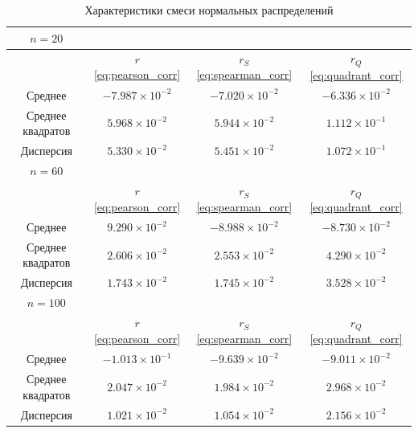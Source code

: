 \documentclass[12pt,a4paper]{article}
\begin{document}
	\begin{table}[htbp!]
		\centering
		\begin{tabular}{ |c|c|c|c| }
			\hline
			\( n = 20 \) & & & \\
			\hline
			& \( r \) \eqref{eq:pearson_corr} & \( r_S \) \eqref{eq:spearman_corr} &
			\( r_Q \) \eqref{eq:quadrant_corr} \\
			\hline
			Среднее & \( -7.987 \times 10^{-2} \) & \( -7.020 \times 10^{-2} \) &
			\( -6.336 \times 10^{-2} \) \\
			\hline
			Среднее квадратов & \(5.968 \times 10^{-2} \) &
			\( 5.944 \times 10^{-2} \) & \( 1.112 \times 10^{-1} \) \\
			\hline
			Дисперсия & \( 5.330 \times 10^{-2} \) &
			\( 5.451 \times 10^{-2} \) & \( 1.072 \times 10^{-1} \) \\
			\hline
			\hline
			\( n = 60 \) & & & \\
			\hline
			& \( r \) \eqref{eq:pearson_corr} & \( r_S \) \eqref{eq:spearman_corr} &
			\( r_Q \) \eqref{eq:quadrant_corr} \\
			\hline
			Среднее & \( 9.290 \times 10^{-2} \) & \( -8.988 \times 10^{-2} \) &
			\( -8.730 \times 10^{-2} \) \\
			\hline
			Среднее квадратов & \( 2.606 \times 10^{-2} \) &
			\( 2.553 \times 10^{-2} \) & \( 4.290 \times 10^{-2} \) \\
			\hline
			Дисперсия & \( 1.743 \times 10^{-2} \) &
			\( 1.745 \times 10^{-2} \) & \( 3.528 \times 10^{-2} \) \\
			\hline
			\hline
			\( n = 100 \) & & & \\
			\hline
			& \( r \) \eqref{eq:pearson_corr} & \( r_S \) \eqref{eq:spearman_corr} &
			\( r_Q \) \eqref{eq:quadrant_corr} \\
			\hline
			Среднее & \( -1.013 \times 10^{-1} \) & \( -9.639 \times 10^{-2} \) &
			\( -9.011 \times 10^{-2} \) \\
			\hline
			Среднее квадратов & \( 2.047 \times 10^{-2} \) &
			\( 1.984 \times 10^{-2} \) & \( 2.968 \times 10^{-2} \) \\
			\hline
			Дисперсия & \( 1.021 \times 10^{-2} \) &
			\( 1.054 \times 10^{-2} \) & \( 2.156 \times 10^{-2} \) \\
			\hline
		\end{tabular}
		\caption{Характеристики смеси нормальных распределений}
	\end{table}
\end{document}
